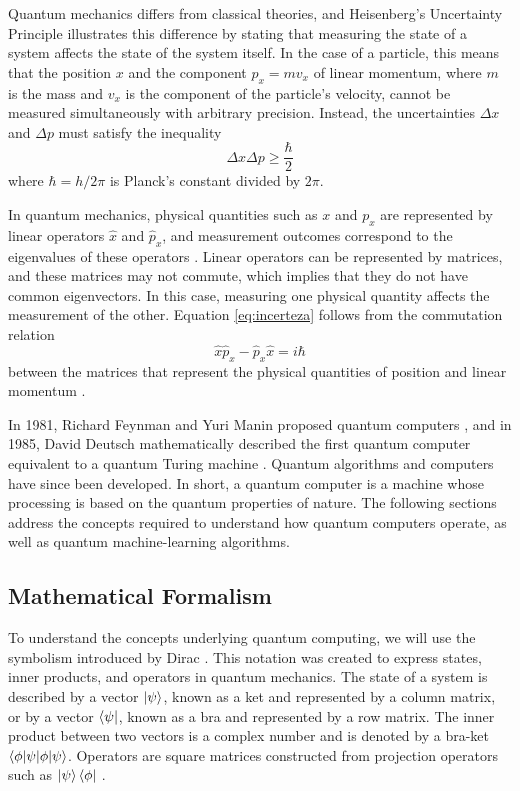 Quantum mechanics differs from classical theories, and Heisenberg's Uncertainty Principle \cite{Mermin2007QComputerScience} illustrates this difference by stating that measuring the state of a system affects the state of the system itself. In the case of a particle, this means that the position $x$ and the component $p_x=mv_x$ of linear momentum, where $m$ is the mass and $v_x$ is the component of the particle's velocity, cannot be measured simultaneously with arbitrary precision. Instead, the uncertainties $\Delta x$ and $\Delta p$ must satisfy the inequality
\begin{equation} \label{eq:incerteza}
\Delta x \Delta p \geq \frac{\hbar}{2}
\end{equation}
\noindent where $\hbar=h/2\pi$ is Planck's constant divided by $2\pi$.

In quantum mechanics, physical quantities such as $x$ and $p_x$ are represented by linear operators $\hat{x}$ and $\hat{p}_x$, and measurement outcomes correspond to the eigenvalues of these operators \cite{Zubairy2020}. Linear operators can be represented by matrices, and these matrices may not commute, which implies that they do not have common eigenvectors. In this case, measuring one physical quantity affects the measurement of the other. Equation \ref{eq:incerteza} follows from the commutation relation
\begin{equation} \label{eq:heisenberg}
\hat{x}\hat{p}_x - \hat{p}_x \hat{x} = i\hbar
\end{equation}
\noindent between the matrices that represent the physical quantities of position and linear momentum \cite{Zubairy2020}.

In 1981, Richard Feynman and Yuri Manin proposed quantum computers \cite{Wong2022IntroductionClassicalQuantum}, and in 1985, David Deutsch mathematically described the first quantum computer equivalent to a quantum Turing machine \cite{Mermin2007QComputerScience}. Quantum algorithms and computers have since been developed. In short, a quantum computer is a machine whose processing is based on the quantum properties of nature. The following sections address the concepts required to understand how quantum computers operate, as well as quantum machine-learning algorithms.

\subsection{Mathematical Formalism} \label{formalismo}

To understand the concepts underlying quantum computing, we will use the symbolism introduced by Dirac \cite{Dirac}. This notation was created to express states, inner products, and operators in quantum mechanics. The state of a system is described by a vector $\ket{\psi}$, known as a ket and represented by a column matrix, or by a vector $\bra{\psi}$, known as a bra and represented by a row matrix. The inner product between two vectors is a complex number and is denoted by a bra-ket $\braket{\phi | \psi}$. Operators are square matrices constructed from projection operators such as $\ket{\psi}\bra{\phi}$ \cite{Dirac,Mermin2007QComputerScience,Zubairy2020,Wong2022IntroductionClassicalQuantum}.

